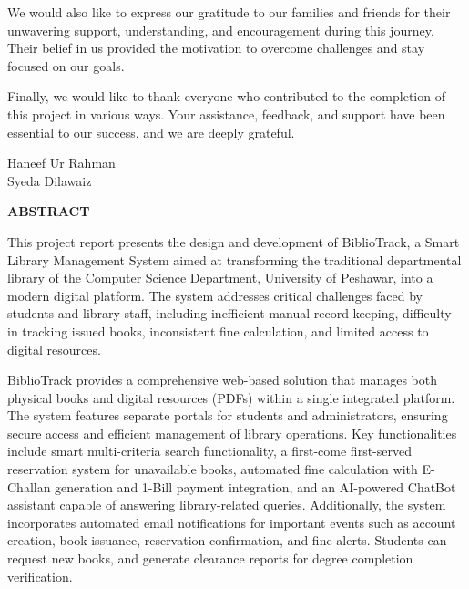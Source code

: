 \documentclass[12pt,a4paper]{report}
\begin{document}
We would also like to express our gratitude to our families and friends for their unwavering support, understanding, and encouragement during this journey. Their belief in us provided the motivation to overcome challenges and stay focused on our goals.

Finally, we would like to thank everyone who contributed to the completion of this project in various ways. Your assistance, feedback, and support have been essential to our success, and we are deeply grateful.

\vspace{1.7cm}
\begin{flushright}
Haneef Ur Rahman\\
Syeda Dilawaiz
\end{flushright}

\newpage
\thispagestyle{plain}
\begin{center}
    {\Large \textbf{ABSTRACT}}
\end{center}

\vspace{0.7cm}

This project report presents the design and development of BiblioTrack, a Smart Library Management System aimed at transforming the traditional departmental library of the Computer Science Department, University of Peshawar, into a modern digital platform. The system addresses critical challenges faced by students and library staff, including inefficient manual record-keeping, difficulty in tracking issued books, inconsistent fine calculation, and limited access to digital resources.

\vspace{0.5cm}
BiblioTrack provides a comprehensive web-based solution that manages both physical books and digital resources (PDFs) within a single integrated platform. The system features separate portals for students and administrators, ensuring secure access and efficient management of library operations. Key functionalities include smart multi-criteria search functionality, a first-come first-served reservation system for unavailable books, automated fine calculation with E-Challan generation and 1-Bill payment integration, and an AI-powered ChatBot assistant capable of answering library-related queries. Additionally, the system incorporates automated email notifications for important events such as account creation, book issuance, reservation confirmation, and fine alerts. Students can request new books, and generate clearance reports for degree completion verification.
\end{document}
